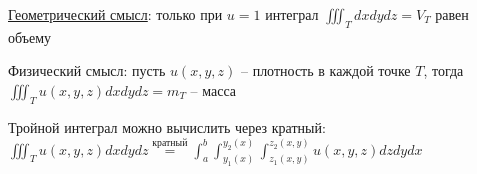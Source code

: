 \documentclass[12pt]{article}
\begin{document}
    \underline{Геометрический смысл}: только при $u = 1$ интеграл $\iiint_T dxdydz = V_T$ равен объему

    Физический смысл: пусть $u(x, y, z)$ -- плотность в каждой точке $T$, тогда $\iiint_T u(x, y, z) dxdydz = m_T$ -- масса

    \hypertarget{tripleintegralcalculation}{}

    Тройной интеграл можно вычислить через кратный: $\iiint_T u(x, y, z) dxdydz \stackrel{\text{кратный}}{=} \int^b_a \int_{y_1(x)}^{y_2(x)} \int_{z_1(x, y)}^{z_2(x, y)} u(x, y, z) dz dy dx$
\end{document}
